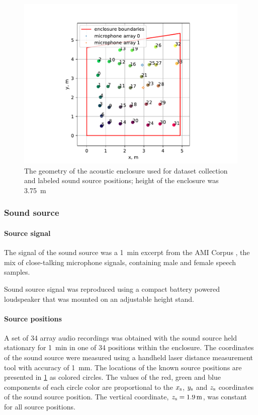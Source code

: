 \documentclass[applsci,article,submit,moreauthors,pdftex]{Definitions/mdpi}
\begin{document}
\begin{figure}[h!]
	\centering
	\includegraphics[scale=0.5]{img/room_src_pos.pdf}
	\caption{The geometry of the acoustic enclosure used for \realworld{} dataset collection and labeled sound source positions; height of the enclosure was \SI{3.75}{\m}}\label{fig:room_src_pos}
\end{figure}

\subsubsection{Sound source}
\paragraph{Source signal}
The signal of the sound source was a \SI{1}{\minute} excerpt from the AMI Corpus \cite{carlettaAMIMeetingCorpus2006}, the mix of close-talking microphone signals, containing male and female speech samples.

Sound source signal was reproduced using a compact battery powered loudspeaker that was mounted on an adjustable height stand.

\paragraph{Source positions}
A set of 34 array audio recordings was obtained with the sound source held stationary for \SI{1}{\minute} in one of 34 positions within the enclosure. The coordinates of the sound source were measured using a handheld laser distance measurement tool with accuracy of \SI{1}{\mm}. The locations of the known source positions are presented in \figurename{} \ref{fig:room_src_pos} as colored circles. The values of the red, green and blue components of each circle color are proportional to the $ x_{\mathrm{s}} $, $ y_{\mathrm{s}} $ and $ z_{\mathrm{s}} $ coordinates of the sound source position.
The vertical coordinate, $ z_{\src} = \SI{1.9}{\m} $, was constant for all source positions.
\end{document}
